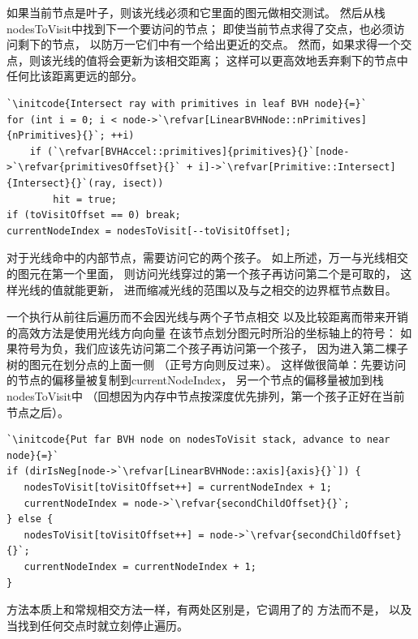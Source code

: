 如果当前节点是叶子，则该光线必须和它里面的图元做相交测试。
然后从栈{\ttfamily nodesToVisit}中找到下一个要访问的节点；
即使当前节点求得了交点，也必须访问剩下的节点，
以防万一它们中有一个给出更近的交点。
然而，如果求得一个交点，则该光线的值将会更新为该相交距离；
这样可以更高效地丢弃剩下的节点中任何比该距离更远的部分。
\begin{lstlisting}
`\initcode{Intersect ray with primitives in leaf BVH node}{=}`
for (int i = 0; i < node->`\refvar[LinearBVHNode::nPrimitives]{nPrimitives}{}`; ++i)
    if (`\refvar[BVHAccel::primitives]{primitives}{}`[node->`\refvar{primitivesOffset}{}` + i]->`\refvar[Primitive::Intersect]{Intersect}{}`(ray, isect))
        hit = true;
if (toVisitOffset == 0) break;
currentNodeIndex = nodesToVisit[--toVisitOffset];
\end{lstlisting}

对于光线命中的内部节点，需要访问它的两个孩子。
如上所述，万一与光线相交的图元在第一个里面，
则访问光线穿过的第一个孩子再访问第二个是可取的，
这样光线的值就能更新，
进而缩减光线的范围以及与之相交的边界框节点数目。

一个执行从前往后遍历而不会因光线与两个子节点相交
以及比较距离而带来开销的高效方法是使用光线方向向量
在该节点划分图元时所沿的坐标轴上的符号：
如果符号为负，我们应该先访问第二个孩子再访问第一个孩子，
因为进入第二棵子树的图元在划分点的上面一侧
（正号方向则反过来）。
这样做很简单：先要访问的节点的偏移量被复制到{\ttfamily currentNodeIndex}，
另一个节点的偏移量被加到栈{\ttfamily nodesToVisit}中
（回想因为内存中节点按深度优先排列，第一个孩子正好在当前节点之后）。
\begin{lstlisting}
`\initcode{Put far BVH node on nodesToVisit stack, advance to near node}{=}`
if (dirIsNeg[node->`\refvar[LinearBVHNode::axis]{axis}{}`]) {
   nodesToVisit[toVisitOffset++] = currentNodeIndex + 1;
   currentNodeIndex = node->`\refvar{secondChildOffset}{}`;
} else {
   nodesToVisit[toVisitOffset++] = node->`\refvar{secondChildOffset}{}`;
   currentNodeIndex = currentNodeIndex + 1;
}
\end{lstlisting}

方法{}本质上和常规相交方法一样，有两处区别是，它调用了的
方法而不是，
以及当找到任何交点时就立刻停止遍历。
